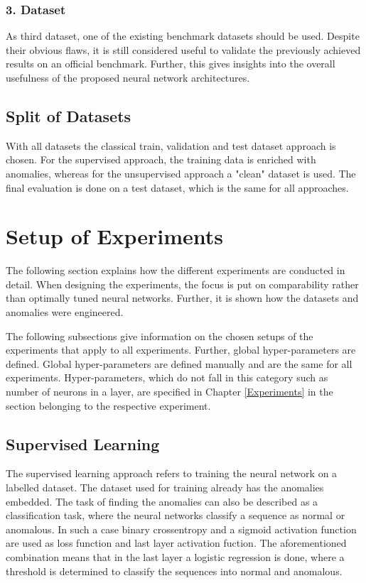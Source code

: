 \subsubsection{3. Dataset}
As third dataset, one of the existing benchmark datasets should be used. Despite their obvious flaws, it is still considered useful to validate the previously achieved results on an official benchmark. Further, this gives insights into the overall usefulness of the proposed neural network architectures.

\subsection{Split of Datasets}
With all datasets the classical train, validation and test dataset approach is chosen. For the supervised approach, the training data is enriched with anomalies, whereas for the unsupervised approach a "clean" dataset is used. The final evaluation is done on a test dataset, which is the same for all approaches.


\section{Setup of Experiments} \label{SetupOfExperiments}
The following section explains how the different experiments are conducted in detail. When designing the experiments, the focus is put on comparability rather than optimally tuned neural networks.  Further, it is shown how the datasets and anomalies were engineered.

The following subsections give information on the chosen setups of the experiments that apply to all experiments. Further, global hyper-parameters are defined. Global hyper-parameters are defined manually and are the same for all experiments. Hyper-parameters, which do not fall in this category such as number of neurons in a layer, are specified in Chapter \ref{Experiments} in the section belonging to the respective experiment.

\subsection{Supervised Learning}
The supervised learning approach refers to training the neural network on a labelled dataset. The dataset used for training already has the anomalies embedded. The task of finding the anomalies can also be described as a classification task, where the neural networks classify a sequence as normal or anomalous. In such a case binary crossentropy and a sigmoid activation function are used as loss function and last layer activation fuction. The aforementioned combination means that in the last layer a logistic regression is done, where a threshold is determined to classify the sequences into normal and anomalous.


